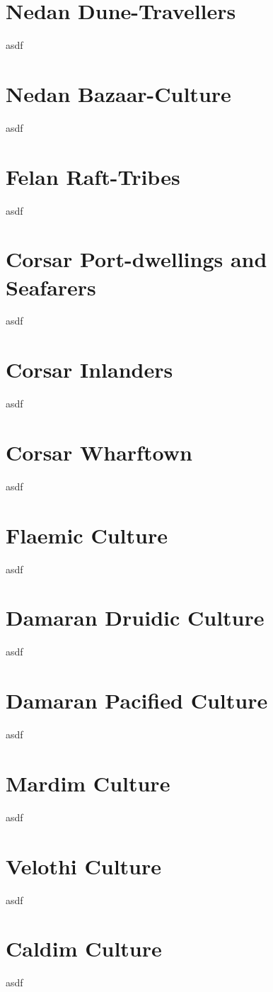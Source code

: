\section{Nedan Dune-Travellers}
asdf

\section{Nedan Bazaar-Culture}
asdf

\section{Felan Raft-Tribes}
asdf

\section{Corsar Port-dwellings and Seafarers}
asdf

\section{Corsar Inlanders}
asdf

\section{Corsar Wharftown}
asdf

\section{Flaemic Culture} %
asdf

\section{Damaran Druidic Culture}
asdf

\section{Damaran Pacified Culture}
asdf

\section{Mardim Culture} %
asdf

\section{Velothi Culture} %
asdf

\section{Caldim Culture} %
asdf